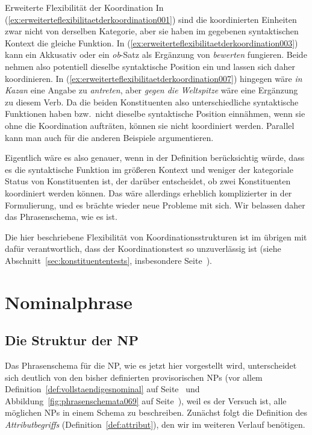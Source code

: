 \begin{Vertiefung}{Erweiterte Flexibilität der Koordination}
In (\ref{ex:erweiterteflexibilitaetderkoordination001}) sind die koordinierten Einheiten zwar nicht von derselben Kategorie, aber sie haben im gegebenen syntaktischen Kontext die gleiche Funktion.
In (\ref{ex:erweiterteflexibilitaetderkoordination003}) kann \zB ein Akkusativ oder ein \textit{ob}-Satz als Ergänzung von \textit{bewerten} fungieren.
Beide nehmen also potentiell dieselbe syntaktische Position ein und lassen sich daher koordinieren.
In (\ref{ex:erweiterteflexibilitaetderkoordination007}) hingegen wäre \textit{in Kazan} eine Angabe zu \textit{antreten}, aber \textit{gegen die Weltspitze} wäre eine Ergänzung zu diesem Verb.
Da die beiden Konstituenten also unterschiedliche syntaktische Funktionen haben bzw.\ nicht dieselbe syntaktische Position einnähmen, wenn sie ohne die Koordination aufträten, können sie nicht koordiniert werden.
Parallel kann man auch für die anderen Beispiele argumentieren.

Eigentlich wäre es also genauer, wenn in der Definition berücksichtig würde, dass es die syntaktische Funktion im größeren Kontext und weniger der kategoriale Status von Konstituenten ist, der darüber entscheidet, ob zwei Konstituenten koordiniert werden können.
Das wäre allerdings erheblich komplizierter in der Formulierung, und es brächte wieder neue Probleme mit sich.
Wir belassen daher das Phrasenschema, wie es ist.

Die hier beschriebene Flexibilität von Koordinationsstrukturen ist im übrigen mit dafür verantwortlich, dass der Koordinationstest so unzuverlässig ist (siehe Abschnitt~\ref{sec:konstituententests}, insbesondere Seite~\pageref{abs:koordinationstest}).

\end{Vertiefung}

\section{Nominalphrase}
\label{sec:nominalphrase}

\subsection{Die Struktur der NP}
\label{sec:diestrukturdernp}

Das Phrasenschema für die NP, wie es jetzt hier vorgestellt wird, unterscheidet sich deutlich von den bisher definierten provisorischen NPs (vor allem Definition~\ref{def:vollstaendigesnominal} auf Seite~\pageref{def:vollstaendigesnominal} und Abbildung~\ref{fig:phrasenschemata069} auf Seite~\pageref{fig:phrasenschemata069}), weil es der Versuch ist, alle möglichen NPs in einem Schema zu beschreiben.
Zunächst folgt die Definition des \textit{Attributbegriffs} (Definition~\ref{def:attribut}), den wir im weiteren Verlauf benötigen.

